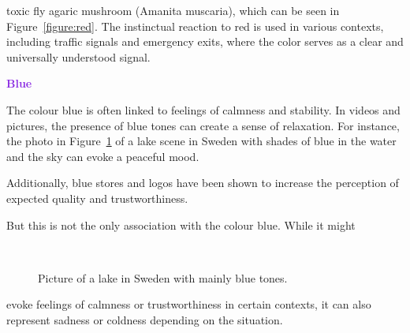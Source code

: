 \documentclass[../MasterThesis.tex]{subfiles}
\begin{document}
\vspace*{-0.6em}
toxic fly agaric mushroom (Amanita muscaria), which can be seen in Figure~\ref{figure:red}.
The instinctual reaction to red is used in various contexts, including traffic signals and emergency exits, where the color serves as a clear and universally understood signal.







\newpage
\textbf{\textcolor{BlueViolet}{Blue}}

%
\begin{minipage}{0.45\textwidth}
	The colour blue is often linked to feelings of calmness and stability. In videos and pictures, the presence of blue tones can create a sense of relaxation. For instance, the photo in Figure~\ref{figure:blue} of a lake scene in Sweden with shades of blue in the water and the sky can evoke a peaceful mood.
	
	Additionally, blue stores and logos have been shown to increase the perception of expected quality and trustworthiness.~\cite{blue_trust, colour2}
	
	But this is not the only association with the colour blue. While it might
	
	
	
\end{minipage}\begin{minipage}{0.05\textwidth}
	\ 
\end{minipage}\begin{minipage}{0.5\textwidth}
	\begin{figure}[H]
		\begin{center}
			\caption[Picture of a lake in Sweden with mainly blue tones.]{Picture of a lake in Sweden with mainly blue tones.}
			\label{figure:blue}
		\end{center}
	\end{figure}\hfill
\end{minipage}
%

\vspace*{-0.6em}
evoke feelings of calmness or trustworthiness in certain contexts, it can also represent sadness or coldness depending on the situation.~\cite{colour2}
\end{document}
